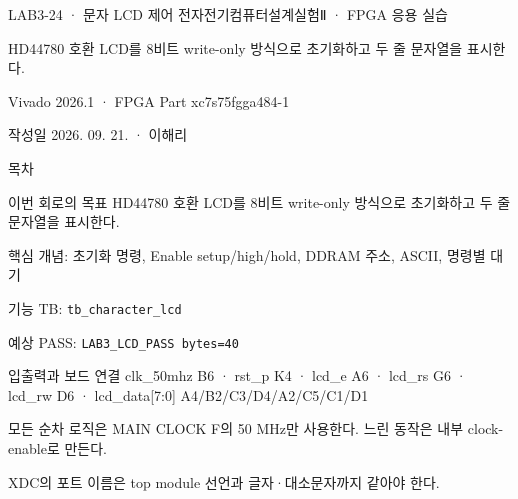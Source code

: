 

\renewcommand{\small}{\fontsize{8.7}{10.5}\selectfont}
\setlength{\leftmargini}{1.35em}

\begin{frame}{LAB3-24 · 문자 LCD 제어}
\small
전자전기컴퓨터설계실험Ⅱ · FPGA 응용 실습\par\vspace{0.28cm}
HD44780 호환 LCD를 8비트 write-only 방식으로 초기화하고 두 줄 문자열을 표시한다.\par\vspace{0.28cm}
Vivado 2026.1 · FPGA Part xc7s75fgga484-1\par\vspace{0.28cm}
작성일 2026. 09. 21. · 이해리
\end{frame}

\begin{frame}[label=lab3-contents]{목차}
\small
{}\par\vspace{0.28cm}
\par\vspace{0.28cm}
\par\vspace{0.28cm}
\par\vspace{0.28cm}
\par\vspace{0.28cm}
\end{frame}

\begin{frame}[label=goal]{이번 회로의 목표}
\small
HD44780 호환 LCD를 8비트 write-only 방식으로 초기화하고 두 줄 문자열을 표시한다.\par\vspace{0.28cm}
핵심 개념: 초기화 명령, Enable setup/high/hold, DDRAM 주소, ASCII, 명령별 대기\par\vspace{0.28cm}
기능 TB: \texttt{tb\_character\_lcd}\par\vspace{0.18cm}
예상 PASS: \texttt{LAB3\_LCD\_PASS bytes=40}
\end{frame}

\begin{frame}{입출력과 보드 연결}
\small
clk\_50mhz B6 · rst\_p K4 · lcd\_e A6 · lcd\_rs G6 · lcd\_rw D6 · lcd\_data[7:0] A4/B2/C3/D4/A2/C5/C1/D1\par\vspace{0.32cm}
모든 순차 로직은 MAIN CLOCK F의 50 MHz만 사용한다. 느린 동작은 내부 clock-enable로 만든다.\par\vspace{0.28cm}
XDC의 포트 이름은 top module 선언과 글자·대소문자까지 같아야 한다.
\end{frame}

